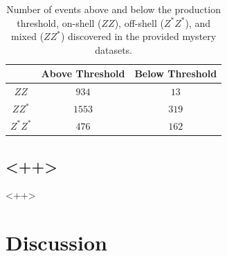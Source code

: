 \documentclass[twoside,        %
               BCOR12mm,       %
               ngerman,english, %
               fleqn,headsepline=false,footsepline=false
              ]{Vorlage/MFPREPORT}
\begin{document}
\begin{table}
\centering
\begin{tabular}{|c|c|c|}
\hline
& Above Threshold& Below
Threshold\\
\hline
$ZZ$&$934$&$13$\\
\hline
$ZZ^*$& $1553$&$319$\\
\hline
$Z^*Z^*$&$476$&$162$\\
\hline
\end{tabular}
\caption{Number
of events
above and
below the
production
threshold,
on-shell
($ZZ$),
off-shell
($Z^*Z^*$),
and mixed
($ZZ^*$)
discovered in
the provided
mystery
datasets.}
\label{tab:ZZcount}
\end{table}

\subsection{<++>}<++>






\section{Discussion}
\label{sec:discussion}



\newpage

\begin{appendices}
\end{appendices}
\end{document}
